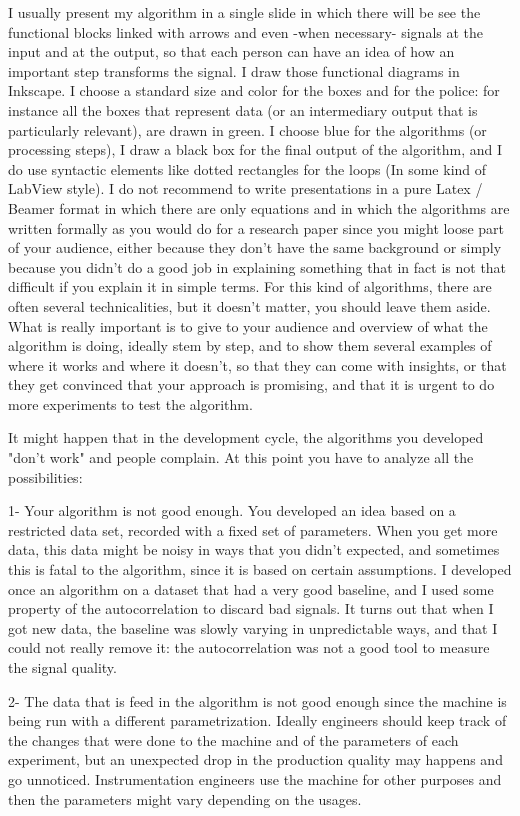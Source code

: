 \documentclass[24pt]{article}
\begin{document}
I usually present my algorithm in a single slide in which there will be see the functional blocks linked with arrows and even -when necessary- signals at the input and at the output, so that each person can have an idea of how an important step transforms the signal. I draw  those functional diagrams in Inkscape. I choose a standard size and color for the boxes and for the police: for instance all the boxes that represent data (or an intermediary output that is particularly relevant), are drawn in green. I choose blue for the algorithms (or processing steps), I draw a black box for the final output of the algorithm, and I do use syntactic elements like dotted rectangles for the loops (In some kind of LabView style).   I do not recommend to write presentations in a pure Latex / Beamer format in which there are only equations and in which the algorithms are written formally as you would do for a research paper since you might loose part of your audience, either because they don't have the same background or simply because you didn't do a good job in explaining something that in fact is not that difficult if you explain it in simple terms. For this kind of algorithms, there are often several technicalities, but it doesn't matter, you should leave them aside. What is really important is to give to your audience and overview of what the algorithm is doing, ideally stem by step, and to show them several examples of where it works and where it doesn't, so that they can come with insights, or that they get convinced that your approach is promising, and that it is urgent to do more experiments to test the algorithm. 
 
  It might happen that in the development cycle, the algorithms you developed "don't work" and people complain. At this point you have to analyze all the possibilities: 
  
  1- Your algorithm is not good enough. You developed an idea based on a restricted data set, recorded with a fixed set of parameters. When you get more data, this data might be noisy in ways that you didn't expected, and sometimes this is fatal to the algorithm, since it is based on certain assumptions. I developed once an algorithm on a dataset that had a very good baseline, and I used some property of the autocorrelation to discard bad signals. It turns out that when I got new data, the baseline was slowly varying in unpredictable ways, and that I could not really remove it: the autocorrelation was not a good tool to measure the signal quality. 
  
  2- The data that is feed in the algorithm is not good enough since the machine is being run with  a different parametrization. Ideally engineers should keep track of the changes that were done to the machine and of the parameters of each experiment, but  an unexpected drop in the production quality may happens and go unnoticed. Instrumentation engineers use the machine for other purposes and then the parameters might vary depending on the usages. 
\end{document}
